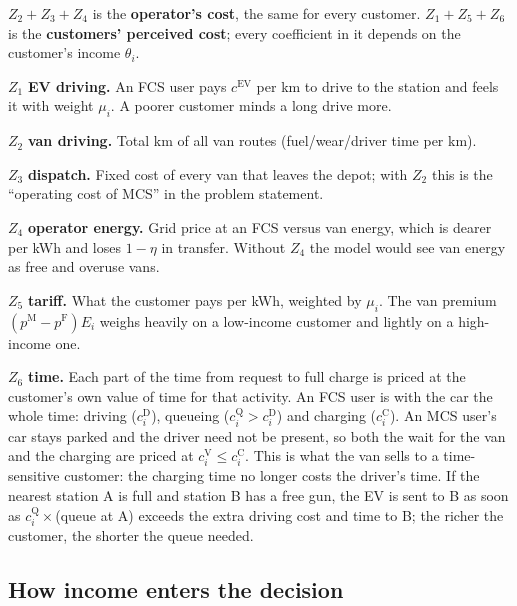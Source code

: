 \documentclass[12pt,a4paper]{article}
\begin{document}
$Z_2+Z_3+Z_4$ is the \textbf{operator's cost}, the same for every customer. $Z_1+Z_5+Z_6$ is the \textbf{customers' perceived cost}; every coefficient in it depends on the customer's income $\theta_i$.

$Z_1$ \textbf{EV driving.} An FCS user pays $c^{\mathrm{EV}}$ per km to drive to the station and feels it with weight $\mu_i$. A poorer customer minds a long drive more.

$Z_2$ \textbf{van driving.} Total km of all van routes (fuel/wear/driver time per km).

$Z_3$ \textbf{dispatch.} Fixed cost of every van that leaves the depot; with $Z_2$ this is the ``operating cost of MCS'' in the problem statement.

$Z_4$ \textbf{operator energy.} Grid price at an FCS versus van energy, which is dearer per kWh and loses $1-\eta$ in transfer. Without $Z_4$ the model would see van energy as free and overuse vans.

$Z_5$ \textbf{tariff.} What the customer pays per kWh, weighted by $\mu_i$. The van premium $(p^{\mathrm M}-p^{\mathrm F})E_i$ weighs heavily on a low-income customer and lightly on a high-income one.

$Z_6$ \textbf{time.} Each part of the time from request to full charge is priced at the customer's own value of time for that activity. An FCS user is with the car the whole time: driving ($c^{\mathrm D}_i$), queueing ($c^{\mathrm Q}_i>c^{\mathrm D}_i$) and charging ($c^{\mathrm C}_i$). An MCS user's car stays parked and the driver need not be present, so both the wait for the van and the charging are priced at $c^{\mathrm V}_i\le c^{\mathrm C}_i$. This is what the van sells to a time-sensitive customer: the charging time no longer costs the driver's time. If the nearest station A is full and station B has a free gun, the EV is sent to B as soon as $c^{\mathrm Q}_i\times$(queue at A) exceeds the extra driving cost and time to B; the richer the customer, the shorter the queue needed.

\subsection{How income enters the decision}
\end{document}
